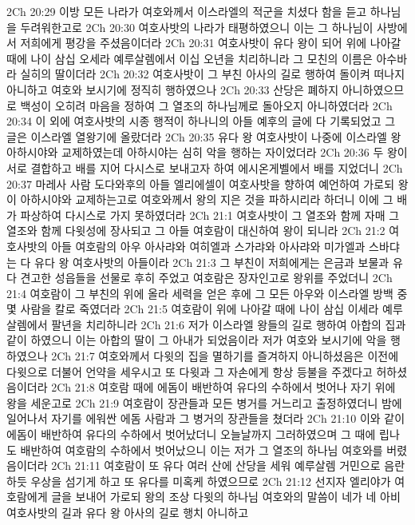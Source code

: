 2Ch 20:29  이방 모든 나라가 여호와께서 이스라엘의 적군을 치셨다 함을 듣고 하나님을 두려워한고로
2Ch 20:30  여호사밧의 나라가 태평하였으니 이는 그 하나님이 사방에서 저희에게 평강을 주셨음이더라
2Ch 20:31  여호사밧이 유다 왕이 되어 위에 나아갈 때에 나이 삼십 오세라 예루살렘에서 이십 오년을 치리하니라 그 모친의 이름은 아수바라 실히의 딸이더라
2Ch 20:32  여호사밧이 그 부친 아사의 길로 행하여 돌이켜 떠나지 아니하고 여호와 보시기에 정직히 행하였으나
2Ch 20:33  산당은 폐하지 아니하였으므로 백성이 오히려 마음을 정하여 그 열조의 하나님께로 돌아오지 아니하였더라
2Ch 20:34  이 외에 여호사밧의 시종 행적이 하나니의 아들 예후의 글에 다 기록되었고 그 글은 이스라엘 열왕기에 올랐더라
2Ch 20:35  유다 왕 여호사밧이 나중에 이스라엘 왕 아하시야와 교제하였는데 아하시야는 심히 악을 행하는 자이었더라
2Ch 20:36  두 왕이 서로 결합하고 배를 지어 다시스로 보내고자 하여 에시온게벨에서 배를 지었더니
2Ch 20:37  마레사 사람 도다와후의 아들 엘리에셀이 여호사밧을 향하여 예언하여 가로되 왕이 아하시야와 교제하는고로 여호와께서 왕의 지은 것을 파하시리라 하더니 이에 그 배가 파상하여 다시스로 가지 못하였더라
2Ch 21:1  여호사밧이 그 열조와 함께 자매 그 열조와 함께 다윗성에 장사되고 그 아들 여호람이 대신하여 왕이 되니라
2Ch 21:2  여호사밧의 아들 여호람의 아우 아사랴와 여히엘과 스가랴와 아사랴와 미가엘과 스바댜는 다 유다 왕 여호사밧의 아들이라
2Ch 21:3  그 부친이 저희에게는 은금과 보물과 유다 견고한 성읍들을 선물로 후히 주었고 여호람은 장자인고로 왕위를 주었더니
2Ch 21:4  여호람이 그 부친의 위에 올라 세력을 얻은 후에 그 모든 아우와 이스라엘 방백 중 몇 사람을 칼로 죽였더라
2Ch 21:5  여호람이 위에 나아갈 때에 나이 삼십 이세라 예루살렘에서 팔년을 치리하니라
2Ch 21:6  저가 이스라엘 왕들의 길로 행하여 아합의 집과 같이 하였으니 이는 아합의 딸이 그 아내가 되었음이라 저가 여호와 보시기에 악을 행하였으나
2Ch 21:7  여호와께서 다윗의 집을 멸하기를 즐겨하지 아니하셨음은 이전에 다윗으로 더불어 언약을 세우시고 또 다윗과 그 자손에게 항상 등불을 주겠다고 허하셨음이더라
2Ch 21:8  여호람 때에 에돔이 배반하여 유다의 수하에서 벗어나 자기 위에 왕을 세운고로
2Ch 21:9  여호람이 장관들과 모든 병거를 거느리고 출정하였더니 밤에 일어나서 자기를 에워싼 에돔 사람과 그 병거의 장관들을 쳤더라
2Ch 21:10  이와 같이 에돔이 배반하여 유다의 수하에서 벗어났더니 오늘날까지 그러하였으며 그 때에 립나도 배반하여 여호람의 수하에서 벗어났으니 이는 저가 그 열조의 하나님 여호와를 버렸음이더라
2Ch 21:11  여호람이 또 유다 여러 산에 산당을 세워 예루살렘 거민으로 음란하듯 우상을 섬기게 하고 또 유다를 미혹케 하였으므로
2Ch 21:12  선지자 엘리야가 여호람에게 글을 보내어 가로되 왕의 조상 다윗의 하나님 여호와의 말씀이 네가 네 아비 여호사밧의 길과 유다 왕 아사의 길로 행치 아니하고
